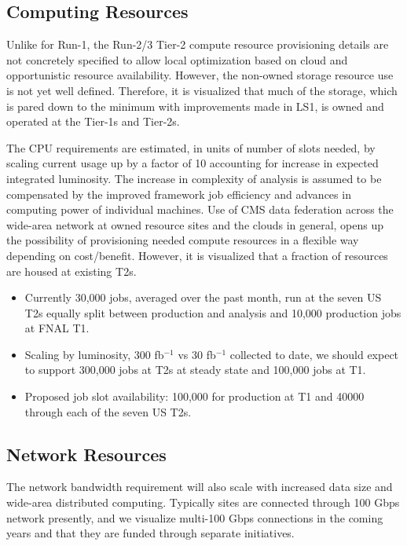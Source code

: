 \subsection{Computing Resources}

Unlike for Run-1, the Run-2/3 Tier-2 compute resource provisioning details are not 
concretely specified to allow local optimization based on cloud and opportunistic
resource availability. However, the non-owned storage resource use is not yet
well defined. Therefore, it is visualized that much of the storage, which is pared 
down to the minimum with improvements made in LS1, is owned and operated at 
the Tier-1s and Tier-2s. 

The CPU requirements are estimated, in units of number of slots needed, by scaling current 
usage up by a factor of 10 accounting for increase in expected integrated luminosity.  The 
increase in complexity of analysis is assumed to be compensated by the improved 
framework job efficiency and advances in computing power of individual machines.
Use of CMS data federation across the wide-area network at owned resource sites
and the clouds in general, opens up the possibility of provisioning needed compute
resources in a flexible way depending on cost/benefit.  However, it is visualized
that a fraction of resources are housed at existing T2s.

\begin{itemize}
\item Currently 30,000 jobs, averaged over the past month, run at the seven 
US T2s equally split between production and analysis and 10,000 production
jobs at FNAL T1.
\item Scaling by luminosity, 300 fb$^{-1}$ vs 30 fb$^{-1}$ collected to date,
we should expect to support 300,000 jobs at T2s at steady state and 100,000
jobs at T1.
\item Proposed job slot availability: 100,000 for production at T1 and 40000 through each of the seven US T2s.
\end{itemize}

\subsection{Network Resources}

The network bandwidth requirement will also scale with increased data size 
and wide-area distributed computing.  Typically sites are connected through
100 Gbps network presently, and we visualize multi-100 Gbps connections
in the coming years and that they are funded through separate initiatives.

